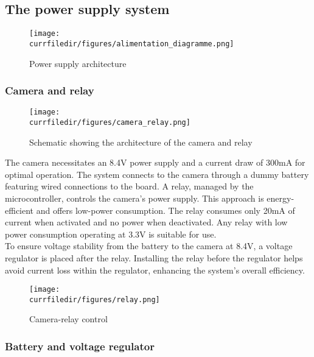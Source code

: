 \newpage
\subsection{The power supply system}

\begin{figure}[!h]
    \centering
    \texttt{[image: \\currfiledir/figures/alimentation\_diagramme.png]}
    \caption{Power supply architecture}
\end{figure}


\subsubsection{Camera and relay}
\begin{figure}[!h]
    \centering
    \texttt{[image: \\currfiledir/figures/camera\_relay.png]}
    \caption{Schematic showing the architecture of the camera and relay}
\end{figure}

The camera necessitates an 8.4V power supply and a current draw of 300mA for optimal operation. The system connects to the camera through a dummy battery featuring wired connections to the board. A relay, managed by the microcontroller, controls the camera's power supply. This approach is energy-efficient and offers low-power consumption. The relay consumes only 20mA of current when activated and no power when deactivated. Any relay with low power consumption operating at 3.3V is suitable for use.\\
To ensure voltage stability from the battery to the camera at 8.4V, a voltage regulator is placed after the relay. Installing the relay before the regulator helps avoid current loss within the regulator, enhancing the system's overall efficiency.



\begin{figure}[!h]
    \centering
    \texttt{[image: \\currfiledir/figures/relay.png]}
    \caption{Camera-relay control}
\end{figure}

\newpage
\subsubsection{Battery and voltage regulator}

\begin{figure}[!h]
    \center{}
\end{figure}

